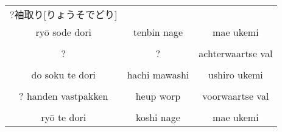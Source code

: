 \documentclass[a4paper,12pt]{article}
\begin{document}
\begin{CJK}{UTF8}{min}
\begin{landscape}
\begin{table}[H]
\begin{center}
\begin{tabular}{ccc}
?袖取り[りょうそでどり]  &   &   \\
ry\={o} sode dori & tenbin nage & mae ukemi\\
\\
? & ? & achterwaartse val\\
\\
do soku te dori & hachi mawashi & ushiro ukemi\\
\\
? handen vastpakken & heup worp & voorwaartse val\\
\\
ry\={o} te dori & koshi nage & mae ukemi
\end{tabular}
\end{center}
\label{kihonnagewaza}
\end{table}
\end{landscape}


\end{CJK}
\end{document}
